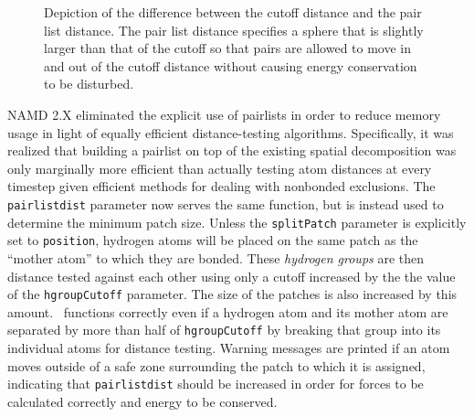 \begin{figure}[htb]
  \caption[Example of cutoff and pairlist distance uses]
  {{\small Depiction of the difference between the cutoff distance and the
  pair list distance.  The pair list distance specifies a sphere that is
  slightly larger than that of the cutoff so that pairs are allowed to
  move in and out of the cutoff distance without causing energy conservation
  to be disturbed.}}
  \label{fig:pairlistdist}
\end{figure}

NAMD 2.X eliminated the explicit use of pairlists in order to reduce memory usage in light of equally efficient distance-testing algorithms.
Specifically, it was realized that building a pairlist on top of the existing spatial decomposition was only marginally more efficient than actually testing atom distances at every timestep given efficient methods for dealing with nonbonded exclusions.
The {\tt pairlistdist} parameter now serves the same function, but is instead used to determine the minimum patch size.
Unless the {\tt splitPatch} parameter is explicitly set to {\tt position}, hydrogen atoms will be placed on the same patch as the ``mother atom'' to which they are bonded.
These {\em hydrogen groups} are then distance tested against each other using only a cutoff increased by the the value of the {\tt hgroupCutoff} parameter.
The size of the patches is also increased by this amount.
\NAMD\ functions correctly even if a hydrogen atom and its mother atom are separated by more than half of {\tt hgroupCutoff} by breaking that group into its individual atoms for distance testing.
Warning messages are printed if an atom moves outside of a safe zone surrounding the patch to which it is assigned, indicating that {\tt pairlistdist} should be increased in order for forces to be calculated correctly and energy to be conserved.

